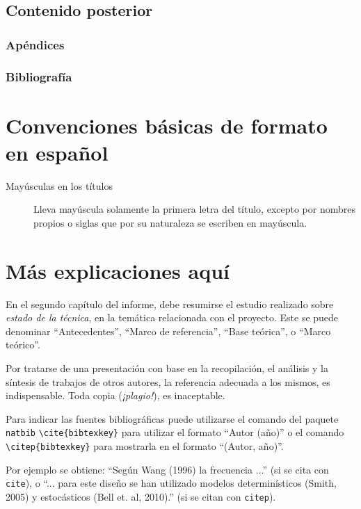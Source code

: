 \subsection{Contenido posterior}

\subsubsection{Apéndices}

\subsubsection{Bibliografía}

\section{Convenciones básicas de formato en español}

\begin{description}
\item[Mayúsculas en los títulos] Lleva mayúscula solamente la primera letra del título, excepto por nombres propios o siglas que por su naturaleza se escriben en mayúscula.
\end{description}


\section{Más explicaciones aquí}

En el segundo capítulo del informe, debe resumirse el estudio realizado sobre \emph{estado de la técnica}, en la temática relacionada con el proyecto.  Este se puede denominar ``Antecedentes'', ``Marco de referencia'', ``Base teórica'', o ``Marco teórico''.

Por tratarse de una presentación con base en la recopilación, el análisis y la síntesis de trabajos de otros autores, la referencia adecuada a los mismos, es indispensable.  Toda copia (\emph{¡plagio!}), es inaceptable.

Para indicar las fuentes bibliográficas puede utilizarse el comando del paquete \texttt{natbib} \texttt{\textbackslash cite\{bibtexkey\}} para utilizar el formato ``Autor (año)'' o el comando \texttt{\textbackslash citep\{bibtexkey\}} para mostrarla en el formato ``(Autor, año)''.

Por ejemplo se obtiene: ``Según Wang (1996) la frecuencia ...'' (si se cita con \texttt{cite}), o ``... para este diseño se han utilizado modelos determinísticos (Smith, 2005) y estocásticos (Bell et. al, 2010).''  (si se citan con \texttt{citep}).  

